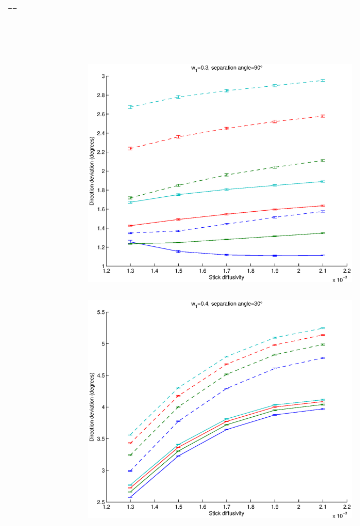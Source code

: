 \documentclass{article}
\begin{document}
\begin{figure}[H]
\begin{adjustwidth}{-\oddsidemargin}{-\rightmargin}
\begin{subfigure}{0.8\paperwidth}
      ~
      \begin{subfigure}{0.3\textwidth}
        \centering
        \includegraphics[width=\textwidth]{figures/synth_bas_weights__snr=20__w1=3__angle=90.eps}
      \end{subfigure}
    \end{subfigure}
    \begin{subfigure}{0.8\paperwidth}
      \begin{subfigure}{0.3\textwidth}
        \centering
        \includegraphics[width=\textwidth]{figures/synth_bas_weights__snr=20__w1=4__angle=30.eps}

\end{subfigure}
\end{subfigure}
\end{adjustwidth}
\end{figure}
\end{document}
